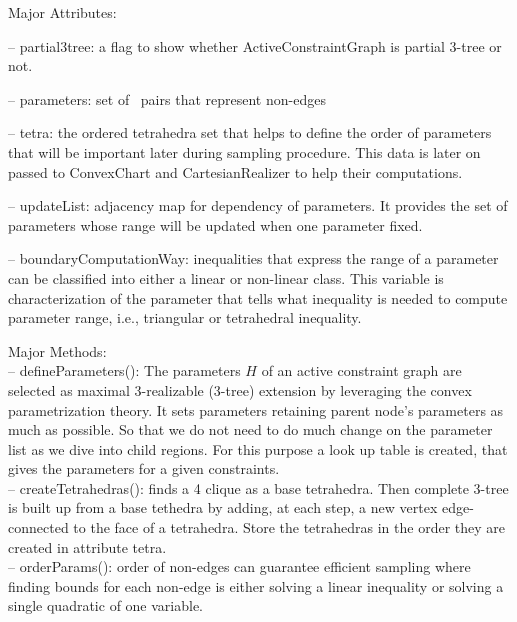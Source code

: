 \begin{enumerate}
\smallskip
Major Attributes:

\noindent --  \textsf{partial3tree}: a flag to show whether ActiveConstraintGraph is partial 3-tree or not.

\noindent --  \textsf{parameters}: set of \atom\ pairs that represent non-edges

\noindent --  \textsf{tetra}: the ordered tetrahedra set that helps to define the order of parameters that will be important later during sampling procedure.
This data is later on passed to ConvexChart and CartesianRealizer to help their computations.

\noindent --  \textsf{updateList}: adjacency map for dependency of parameters. It provides the set of parameters whose range will be updated when one parameter fixed.

\noindent --  \textsf{boundaryComputationWay}:  inequalities that express the range of a parameter can be classified into either a linear or non-linear class.
This variable is characterization of the parameter that tells what inequality is needed to compute parameter range, i.e., triangular or tetrahedral inequality.

\smallskip
Major Methods:\\
\smallskip
\noindent --  \textsf{defineParameters()}:
The parameters $H$ of an active constraint graph are selected as maximal 3-realizable (3-tree) extension by leveraging the convex parametrization theory. %
It sets parameters retaining parent node's parameters as much as possible. So that we do not need to do much change on the parameter list as we dive into child regions.
For this purpose a look up table is created, that gives the parameters for a given constraints.\\
\smallskip
\noindent --  \textsf{createTetrahedras()}:
finds a 4 clique as a base tetrahedra. Then complete 3-tree is built up from a base tethedra by adding, at each step, a new vertex
edge-connected to the face of a tetrahedra. Store the tetrahedras in the order they are created in attribute \textsf{tetra}.\\
\smallskip
\noindent --  \textsf{orderParams()}: order of non-edges can guarantee efficient
sampling where finding bounds for each non-edge is either solving a linear inequality or
solving a single quadratic of one variable. \cite{ugandhar}


\end{enumerate}
